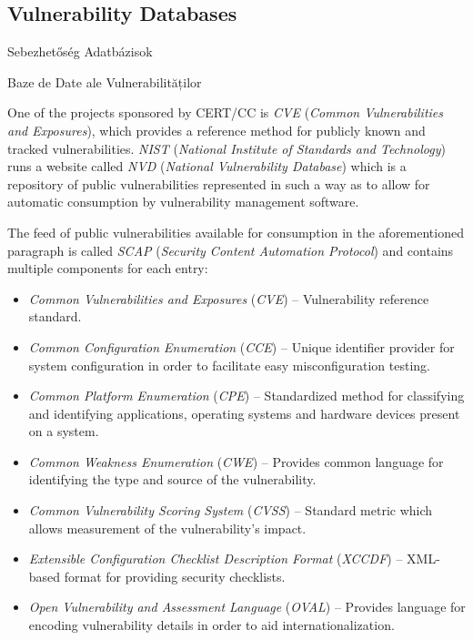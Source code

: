 \documentclass[a4paper,12pt]{article}
\newcommand\subsectionhu[1]{\addcontentsline{toc.hu}{subsection} {\protect\numberline{\thesubsection} #1}}
\newcommand\subsectionro[1]{\addcontentsline{toc.ro}{subsection} {\protect\numberline{\thesubsection} #1}}
\begin{document}
\subsection{Vulnerability Databases} \label{ssec:vulndbs}
\subsectionhu{Sebezhetőség Adatbázisok} \subsectionro{Baze de Date ale Vulnerabilităților}
	
	One of the projects sponsored by CERT/CC is \textit{CVE} (\textit{Common Vulnerabilities and Exposures}), which provides a reference method for publicly known and tracked vulnerabilities. \textit{NIST} (\textit{National Institute of Standards and Technology}) runs a website called \textit{NVD} (\textit{National Vulnerability Database}) which is a repository of public vulnerabilities represented in such a way as to allow for automatic consumption by vulnerability management software\cite{nvd15}.
	
	The feed of public vulnerabilities available for consumption in the aforementioned paragraph is called \textit{SCAP} (\textit{Security Content Automation Protocol}) and contains multiple components for each entry:
	
	\begin{itemize}
		\item \textit{Common Vulnerabilities and Exposures} (\textit{CVE}) -- Vulnerability reference standard.
		\item \textit{Common Configuration Enumeration} (\textit{CCE}) -- Unique identifier provider for system configuration in order to facilitate easy misconfiguration testing.
		\item \textit{Common Platform Enumeration} (\textit{CPE}) -- Standardized method for classifying and identifying applications, operating systems and hardware devices present on a system.
		\item \textit{Common Weakness Enumeration} (\textit{CWE}) -- Provides common language for identifying the type and source of the vulnerability.
		\item \textit{Common Vulnerability Scoring System} (\textit{CVSS}) -- Standard metric which allows measurement of the vulnerability's impact.
		\item \textit{Extensible Configuration Checklist Description Format} (\textit{XCCDF}) -- XML-based format for providing security checklists.
		\item \textit{Open Vulnerability and Assessment Language} (\textit{OVAL}) -- Provides language for encoding vulnerability details in order to aid internationalization.
	\end{itemize}
	
\end{document}

